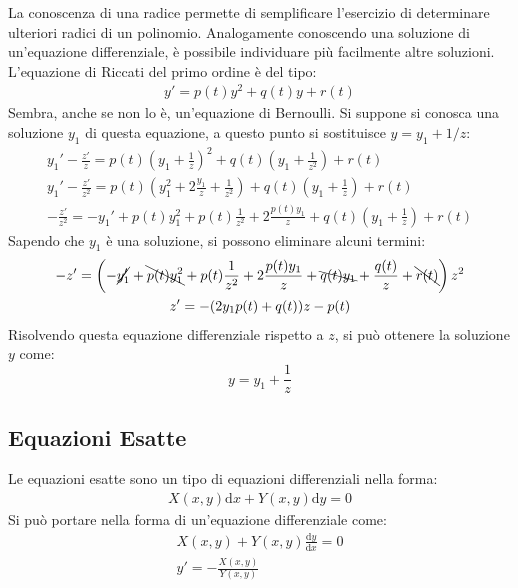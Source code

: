 \documentclass{article}
\newcommand{\df}{\mathrm{d}}
\numberwithin{equation}{subsection}
\begin{document}
La conoscenza di una radice permette di semplificare l'esercizio di determinare ulteriori radici di un polinomio. Analogamente conoscendo una soluzione di un'equazione differenziale, è possibile individuare più facilmente altre soluzioni. 
L'equazione di Riccati del primo ordine è del tipo:
\begin{gather}
    y'=p(t)y^2+q(t)y+r(t)
\end{gather}
Sembra, anche se non lo è, un'equazione di Bernoulli. Si suppone si conosca una soluzione $y_1$ di questa equazione, a questo punto si sostituisce $y=y_1+1/z$:
\begin{gather*}
    y_1'-\displaystyle\frac{z'}{z}=p(t)\left(y_1+\frac{1}{z}\right)^2+q(t)\left(y_1+\frac{1}{z^2}\right)+r(t)\\
    y_1'-\displaystyle\frac{z'}{z^2}=p(t)\left(y_1^2+2\frac{y_1}{z}+\frac{1}{z^2}\right)+q(t)\left(y_1+\frac{1}{z}\right)+r(t)\\
    \displaystyle-\frac{z'}{z^2}=-y_1'+p(t)y_1^2+p(t)\frac{1}{z^2}+2\frac{p(t)y_1}{z}+q(t)\left(y_1+\frac{1}{z}\right)+r(t)
\end{gather*}
Sapendo che $y_1$ è una soluzione, si possono eliminare alcuni termini:
\begin{gather*}
    -z'=\left(-\cancel{y_1'}+\bcancel{p(t)y_1^2}+p(t)\frac{1}{z^2}+2\frac{p(t)y_1}{z}+\bcancel{q(t)y_1}+\frac{q(t)}{z}+\bcancel{r(t)}\right)z^2\\
    z'=-(2y_1p(t)+q(t))z-p(t)
\end{gather*}
Risolvendo questa equazione differenziale rispetto a $z$, si può ottenere la soluzione $y$ come:
\begin{equation}
    y=y_1+\frac{1}{z}
\end{equation}

\subsection{Equazioni Esatte}

Le equazioni esatte sono un tipo di equazioni differenziali nella forma:
\begin{gather}
    X(x,y)\df x+Y(x,y)\df y=0
\end{gather}
Si può portare nella forma di un'equazione differenziale come:
\begin{gather*}
    X(x,y)+Y(x,y)\displaystyle\frac{\df y}{\df x}=0\\
    y'=\displaystyle-\frac{X(x,y)}{Y(x,y)}
\end{gather*}
\end{document}

